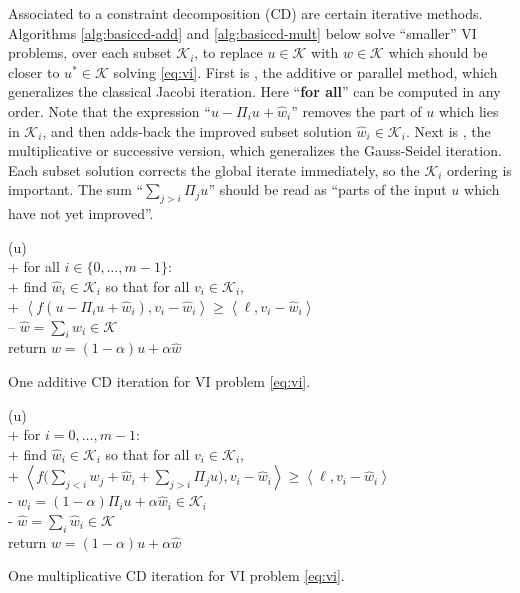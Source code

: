 \documentclass[letterpaper,final,12pt,reqno]{amsart}
\theoremstyle{cstyle}
\theoremstyle{cstyle*}
\theoremstyle{dstyle}
\numberwithin{equation}{section}
\numberwithin{figure}{section}
\numberwithin{table}{section}
\numberwithin{theorem}{section}
\newcommand{\cK}{\mathcal{K}}
\newcommand{\ip}[2]{\left<#1,#2\right>}
\begin{document}
Associated to a constraint decomposition (CD) are certain iterative methods.  Algorithms \ref{alg:basiccd-add} and \ref{alg:basiccd-mult} below solve ``smaller'' VI problems, over each subset $\cK_i$, to replace $u \in \cK$ with $w\in\cK$ which should be closer to $u^* \in \cK$ solving \eqref{eq:vi}.  First is , the additive or parallel method, which generalizes the classical Jacobi iteration.  Here ``\textbf{for all}'' can be computed in any order.  Note that the expression ``$u-\Pi_iu+\hat w_i$'' removes the part of $u$ which lies in $\mathcal{K}_i$, and then adds-back the improved subset solution $\hat w_i \in \mathcal{K}_i$.  Next is , the multiplicative or successive version, which generalizes the Gauss-Seidel iteration.  Each subset solution corrects the global iterate immediately, so the $\mathcal{K}_i$ ordering is important.  The sum ``$\sum_{j>i} \Pi_j u$'' should be read as ``parts of the input $u$ which have not yet improved''.


\begin{pseudofloat}[H]
\begin{pseudo*}
(u)\text{:} \\+
    for all $i \in \{0,\dots,m-1\}$: \\+
        \rm{find} $\hat w_i\in \cK_i$ \rm{so that for all} $v_i\in \cK_i$, \\+
            $\boxed{\ip{f(u - \Pi_i u + \hat w_i)}{v_i-\hat w_i} \ge \ip{\ell}{v_i-\hat w_i}}$ \\--
    $\hat w = \sum_i \hat w_i\in\cK$ \\
    return $w=(1-\alpha) u + \alpha \hat w$
\end{pseudo*}
\caption{One additive CD iteration for VI problem \eqref{eq:vi}.}
\label{alg:basiccd-add}
\end{pseudofloat}

\begin{pseudofloat}
\begin{pseudo*}
(u)\text{:} \\+
    for $i = 0,\dots,m-1$: \\+
        \rm{find} $\hat w_i\in \cK_i$ \rm{so that for all} $v_i\in \cK_i$, \\+
            $\displaystyle \boxed{\ip{f\Big(\sum_{j<i} w_j + \hat w_i + \sum_{j>i} \Pi_j u\Big)}{v_i-\hat w_i} \ge \ip{\ell}{v_i-\hat w_i}}$ \\-
            $w_i = (1-\alpha) \Pi_i u + \alpha \hat w_i\in\cK_i$ \\-
    $\hat w = \sum_i \hat w_i\in\cK$ \\
    return $w=(1-\alpha) u + \alpha \hat w$
\end{pseudo*}
\caption{One multiplicative CD iteration for VI problem \eqref{eq:vi}.}
\label{alg:basiccd-mult}
\end{pseudofloat}
\end{document}
